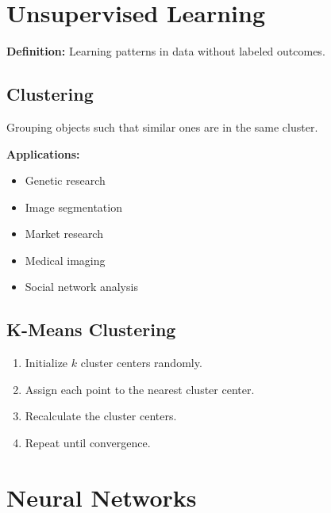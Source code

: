 \section{Unsupervised Learning}

\textbf{Definition:} Learning patterns in data without labeled outcomes.

\subsection*{Clustering}

Grouping objects such that similar ones are in the same cluster.

\textbf{Applications:}
\begin{itemize}
    \item Genetic research
    \item Image segmentation
    \item Market research
    \item Medical imaging
    \item Social network analysis
\end{itemize}

\subsection*{K-Means Clustering}

\begin{enumerate}
    \item Initialize $k$ cluster centers randomly.
    \item Assign each point to the nearest cluster center.
    \item Recalculate the cluster centers.
    \item Repeat until convergence.
\end{enumerate}

\begin{center}
\end{center}

\section{Neural Networks}

